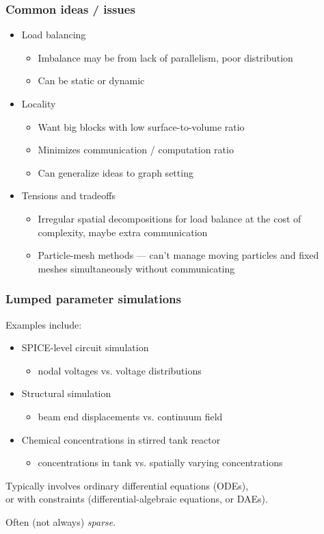 \documentclass{beamer}
\begin{document}
\begin{frame}
  \frametitle{Common ideas / issues}

  \begin{itemize}
  \item Load balancing
    \begin{itemize}
    \item Imbalance may be from lack of parallelism, poor distribution
    \item Can be static or dynamic
    \end{itemize}
  \item Locality
    \begin{itemize}
    \item Want big blocks with low surface-to-volume ratio
    \item Minimizes communication / computation ratio
    \item Can generalize ideas to graph setting
    \end{itemize}
  \item Tensions and tradeoffs
    \begin{itemize}
    \item Irregular spatial decompositions for load balance
      at the cost of complexity, maybe extra communication
    \item Particle-mesh methods --- can't manage moving particles
      and fixed meshes simultaneously without communicating
    \end{itemize}
  \end{itemize}

\end{frame}


\begin{frame}
  \frametitle{Lumped parameter simulations}

  Examples include:
  \begin{itemize}
  \item SPICE-level circuit simulation 
    \begin{itemize}
    \item nodal voltages vs. voltage distributions
    \end{itemize}
  \item Structural simulation 
    \begin{itemize}
    \item beam end displacements vs. continuum field
    \end{itemize}
  \item Chemical concentrations in stirred tank reactor
    \begin{itemize}
    \item concentrations in tank vs. spatially varying concentrations
    \end{itemize}
  \end{itemize}
  
  \vspace{5mm}
  Typically involves ordinary differential equations (ODEs), \\
  or with constraints (differential-algebraic equations, or DAEs).

  \vspace{5mm}
  Often (not always) {\em sparse}.
\end{frame}
\end{document}

